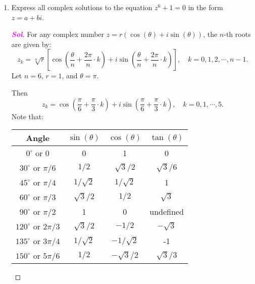 \documentclass{article}
\theoremstyle{definition}
\newcommand{\of}[1]{\left( #1 \right)}
\newcommand{\sol}{\textcolor{magenta}{\bf Sol}}
\renewcommand{\Re}{\operatorname{Re}}
\renewcommand{\Im}{\operatorname{Im}}
\begin{document}
\begin{enumerate}
		\item  Express all complex solutions to the equation $z^6 + 1 = 0$ in the form $z = a + bi$.
		\begin{proof}[\sol]
			For any complex number $z = r(\cos(\theta) + i\sin(\theta))$, the $n$-th roots are given by: \[
			z_k=\sqrt[n]{r}\left[\cos\of{\frac{\theta}{n}+\frac{2\pi}{n}\cdot k}+i\sin\of{\frac{\theta}{n}+\frac{2\pi}{n}\cdot k}\right],\quad k=0,1,2,\cdots,n-1.
			\] Let $n=6$, $r=1$, and $\theta = \pi$.
			\iffalse
			because \begin{center}
				\begin{center}
					\begin{tikzpicture}
					\draw[thick,->] (-1.5,0) -- (1.5,0) node[below] {$\Re$};
					\draw[thick,->] (0,-1.5) -- (0,1.5) node[left] {$\Im$};
					
					\draw[dashed, thick, red] (0,0) -- (-1,0) node[midway, above, black] {$1$};
					\draw[fill, red] (-1,0) circle (1.5pt) node[below left] {$-1$};
					\draw[->, thick, orange] (0.3,0) arc (0:180:0.3) node[midway, right, black] {$\pi$};
					\draw (0,0) circle (1);
					\end{tikzpicture}
				\end{center}
			\end{center}
			\fi
			Then \[
			z_k=\cos\of{\frac{\pi}{6}+\frac{\pi}{3}\cdot k}+i\sin\of{\frac{\pi}{6}+\frac{\pi}{3}\cdot k},\quad k=0,1,\cdots, 5.
			\]
			Note that: \begin{table}[ht!]
				\centering
				\begin{tabular}{c||c|c|c}
					\toprule
					Angle & $\sin(\theta)$ & $\cos(\theta)$ & $\tan(\theta)$ \\
					\midrule
					$0^\circ$ or $0$ & 0 & 1 & 0 \\
					$30^\circ$ or ${\pi}/{6}$ & ${1}/{2}$ & ${\sqrt{3}}/{2}$ & ${\sqrt{3}}/{6}$ \\
					$45^\circ$ or ${\pi}/{4}$ & ${1}/{\sqrt{2}}$ & ${1}/{\sqrt{2}}$ & 1 \\
					$60^\circ$ or ${\pi}/{3}$ & ${\sqrt{3}}/{2}$ & ${1}/{2}$ & $\sqrt{3}$ \\
					$90^\circ$ or ${\pi}/{2}$ & 1 & 0 & undefined \\
					$120^\circ$ or ${2\pi}/{3}$ & ${\sqrt{3}}/{2}$ & $-{1}/{2}$ & $-\sqrt{3}$ \\
					$135^\circ$ or ${3\pi}/{4}$ & ${1}/{\sqrt{2}}$ & $-{1}/{\sqrt{2}}$ & -1 \\
					$150^\circ$ or ${5\pi}/{6}$ & ${1}/{2}$ & $-{\sqrt{3}}/{2}$ & ${\sqrt{3}}/{3}$ \\

\end{tabular}
\end{table}
\end{proof}
\end{enumerate}
\end{document}
